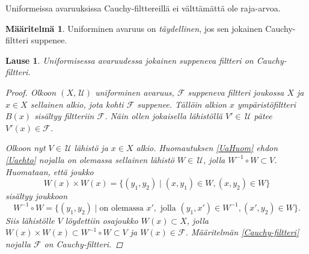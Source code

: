 \documentclass[12pt,a4paper,leqno]{report}
\newcommand{\U}{\,\mathcal{U}}
\newcommand{\F}{\mathcal{F}}
\theoremstyle{plain}
\newtheorem{lause}[equation]{Lause}
\theoremstyle{definition}
\newtheorem{maar}[equation]{Määritelmä}
\theoremstyle{remark}
\begin{document}
\noindent Uniformeissa avaruuksissa Cauchy-filttereillä ei välttämättä ole raja-arvoa.

\begin{maar}
Uniforminen avaruus on \emph{täydellinen}, 
jos sen jokainen Cauchy-filtteri suppenee.
\end{maar}
\begin{lause}
Uniformisessa avaruudessa jokainen suppeneva filtteri on Cauchy-filtteri.
\begin{proof}
Olkoon $(X,\U)$ uniforminen avaruus, $\F$ suppeneva filtteri joukossa $X$ ja $x\in X$ 
sellainen alkio, jota kohti $\F$ suppenee. 
Tällöin alkion $x$ ympäristöfiltteri $B(x)$ sisältyy filtteriin $\F$. 
Näin ollen jokaisella lähistöllä $V'\in\U$ pätee $V'(x)\in\F$. 

Olkoon nyt $V\in\U$ lähistö ja $x\in X$ alkio. Huomautuksen \ref{UaHuom} ehdon \ref{Uaehto} nojalla on olemassa 
sellainen lähistö $W\in\U$, jolla $W^{-1}\circ W\subset V$. 
Huomataan, että joukko 
$$W(x)\times W(x)=\{ (y_1,y_2)\mid (x,y_1)\in W,(x,y_2)\in W\} $$
sisältyy joukkoon 
$$W^{-1}\circ W=\{ (y_1,y_2)\mid \text{on olemassa }x',\text{ jolla }(y_1,x')\in W^{-1},(x',y_2)\in W\}.$$ 
Siis lähistölle $V$ löydettiin osajoukko $W(x)\subset X$, 
jolla $W(x)\times W(x)\subset W^{-1}\circ W\subset V$ ja $W(x)\in\F$. 
Määritelmän \ref{Cauchy-filtteri} nojalla $\F$ on Cauchy-filtteri.
\end{proof}
\end{lause}
\end{document}
